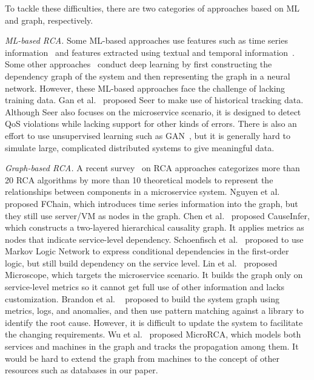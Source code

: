 To tackle these difficulties, there are two categories of approaches based on ML and graph, respectively. 

\emph{ML-based RCA.} Some ML-based approaches use features such as time series information~\cite{ma2020diagnosing, weng2018root} and features extracted using textual and temporal information~\cite{zhao2020automatically}. Some other approaches~\cite{xu2018unsupervised} conduct deep learning by first constructing the dependency graph of the system and then representing the graph in a neural network. However, these ML-based approaches face the challenge of lacking training data. Gan et al.~\cite{gan2019seer} proposed Seer to make use of historical tracking data. Although Seer also focuses on the microservice scenario, it is designed to detect QoS violations while lacking support for other kinds of errors. There is also an effort to use unsupervised learning such as GAN~\cite{xu2018unsupervised}, but it is generally hard to simulate large, complicated distributed systems to give meaningful data.

\emph{Graph-based RCA.} A recent survey~\cite{sole2017survey} on RCA approaches categorizes more than 20 RCA algorithms by more than 10 theoretical models to represent the relationships between components in a microservice system.  
Nguyen et al.~\cite{nguyen2013fchain} proposed FChain, which introduces time series information into the graph, but they still use server/VM as nodes in the graph. Chen et al.~\cite{chen2014causeinfer}  proposed CauseInfer, which constructs a two-layered hierarchical causality graph. It applies metrics as nodes that indicate service-level dependency. Schoenfisch et al.~\cite{schoenfisch2018root} proposed to use Markov Logic Network to express conditional dependencies in the first-order logic, but still build dependency on the service level. Lin et al.~\cite{lin2018microscope} proposed Microscope, which targets the microservice scenario. It builds the graph only on service-level metrics so it cannot get full use of other information and lacks customization. Brandon et al. ~\cite{brandon2020graph} proposed to build the system graph using metrics, logs, and anomalies, and then use pattern matching against a library to identify the root cause. However, it is difficult to update the system to facilitate the changing requirements. Wu et al.~\cite{wu2020microrca} proposed MicroRCA, which models both services and machines in the graph and tracks the propagation among them. It would be hard to extend the graph from machines to the concept of other resources such as databases in our paper. 

